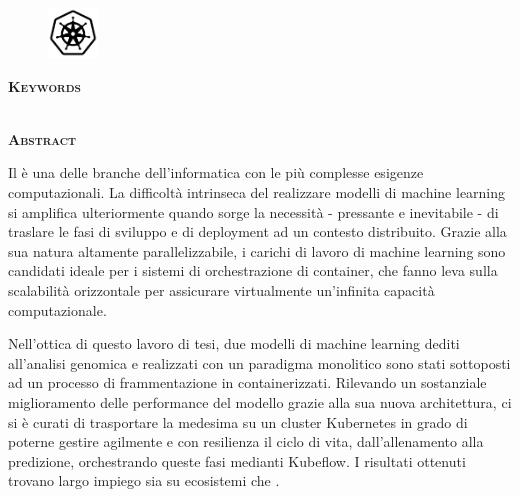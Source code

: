 % 
% 
% 

\newpage

\clearpage
\cleardoublepage
{}

\pagestyle{plain}

{}

\begin{figure}
    \centering
    \includegraphics[width=50px]{figures/logos/k8s-bw-2.png}
    \label{fig:abstract:kubernetes}
\end{figure}

\begin{center}
    \large \textbf{\thesisTitle}
\end{center}

{\noindent \textbf{\textsc{Keywords}}}

{\noindent \thesisKeywords}\\


{\noindent \textbf{\textsc{Abstract}}}

\noindent Il  è una delle branche dell'informatica con le più complesse esigenze computazionali. La difficoltà intrinseca del realizzare modelli di machine learning si amplifica ulteriormente quando sorge la necessità - pressante e inevitabile - di traslare le fasi di sviluppo e di deployment ad un contesto distribuito. Grazie alla sua natura altamente parallelizzabile, i carichi di lavoro di machine learning sono candidati ideale per i sistemi di orchestrazione di container, che fanno leva sulla scalabilità orizzontale per assicurare virtualmente un'infinita capacità computazionale.

Nell'ottica di questo lavoro di tesi, due modelli di machine learning dediti all'analisi genomica e realizzati con un paradigma monolitico sono stati sottoposti ad un processo di frammentazione in  containerizzati. Rilevando un sostanziale miglioramento delle performance del modello grazie alla sua nuova architettura, ci si è curati di trasportare la medesima su un cluster Kubernetes in grado di poterne gestire agilmente e con resilienza il ciclo di vita, dall'allenamento alla predizione, orchestrando queste fasi medianti Kubeflow. I risultati ottenuti trovano largo impiego sia su ecosistemi \textit{} che \textit{}.

